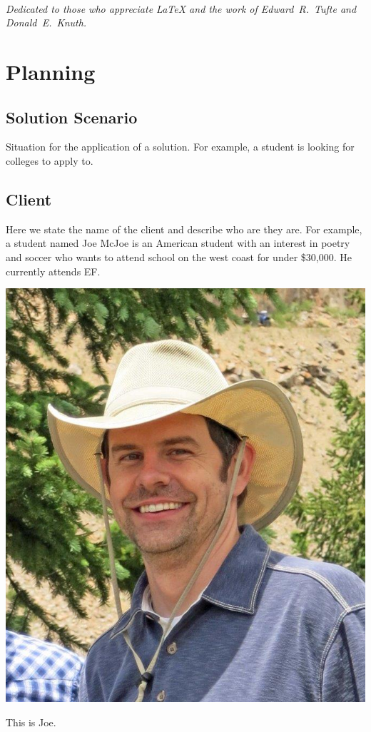 \documentclass{tufte-book}
\begin{document}
\tableofcontents

\listoffigures

\listoftables

\cleardoublepage
~\vfill
\begin{doublespace}
\noindent\fontsize{18}{22}\selectfont\itshape
\nohyphenation
Dedicated to those who appreciate \LaTeX{} 
and the work of \mbox{Edward R.~Tufte} 
and \mbox{Donald E.~Knuth}.
\end{doublespace}
\vfill
\vfill


\cleardoublepage

\chapter{Planning}

\section{Solution Scenario}
Situation for the application of a solution.  For example, a student is looking for colleges to apply to.

\section{Client}
Here we state the name of the client and describe who are they are.  For example, a student named Joe McJoe is an American student with an interest in poetry and soccer who wants to attend school on the west coast for under \$30,000.  He currently attends EF.
\begin{marginfigure}[0pt]
  \includegraphics[width=\linewidth]{joemcjoe.jpg}
  \caption{This is Joe.}
  \label{fig:marginfig}
\end{marginfigure}
\end{document}
